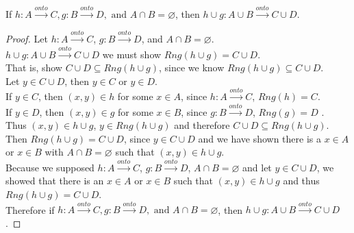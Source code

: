 \documentclass[a4paper,11pt]{article}
\begin{document}
\begin{theorem1}
  If \(h:A \xrightarrow{onto} C, g:B\xrightarrow{onto}D, \text{ and } A \cap B = \varnothing\), 
  then \(h \cup g: A \cup B \xrightarrow{onto} C \cup D\).
  \begin{proof}
Let \(h: A \xrightarrow{onto} C\), \(g: B \xrightarrow{onto} D\), and \(A \cap B = 
\varnothing\).\\
\(h \cup g: A \cup B \xrightarrow{onto} C \cup D\) we must show \(Rng{(h \cup g)} = C \cup D\).\\
That is, show \(C \cup D \subseteq Rng{(h \cup g)}\), since we know \(Rng{(h \cup g)} \subseteq C \cup D\).\\
Let \(y \in C \cup D\), then \(y \in C\) or \(y \in D\).\\
If \(y \in C\), then \({(x,y)} \in h\) for some \(x \in A\), since \(h:A \xrightarrow{onto} 
C\), \(Rng{(h)}=C\).\\
If \(y \in D\), then \({(x,y)} \in g\) for some \(x \in B\), since \(g:B \xrightarrow{onto} D\), \(Rng{(g)}=D\) 
.\\
Thus \({(x,y)} \in h \cup g\), \({y \in Rng{(h \cup g)}}\) and therefore \(C \cup D \subseteq Rng{(h \cup g)}\).\\
Then \(Rng{(h \cup g)} = C \cup D\), since \(y \in C \cup D\) and we have shown there is a \(x \in A\) or \(x \in B\) with \(A \cap B = \varnothing\) such that \({(x,y)} \in h \cup g\).\\
Because we supposed \(h: A \xrightarrow{onto} C\), \(g: B \xrightarrow{onto} D\), \(A \cap B = 
\varnothing\) and let \(y \in C \cup D\), we showed that there is an \(x \in A\) 
or \(x \in B\) such that \({(x,y)} \in h \cup g\) and thus \(Rng{(h \cup g)} = C \cup 
D\).\\
Therefore if \(h:A \xrightarrow{onto} C, g:B\xrightarrow{onto}D, \text{ and } A \cap B = \varnothing\), 
  then \(h \cup g: A \cup B \xrightarrow{onto} C \cup D\).
  \end{proof}
\end{theorem1}
\newpage
\addtocounter{ProblemCounter}{1}
\end{document}
